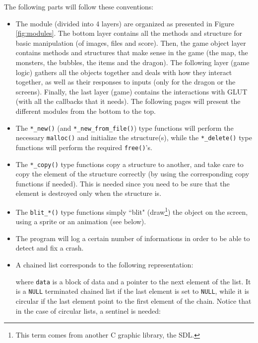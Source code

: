 \documentclass[12pt,a4paper]{article}
\newcommand{\cc}[1]{\texttt{#1}}
\begin{document}
The following parts will follow these conventions:

\begin{itemize}
\item The module (divided into 4 layers) are organized as presented in Figure \ref{fig:modules}. The bottom layer contains all the methods and structure for basic manipulation (of images, files and score). Then, the game object layer contains methods and structures that make sense in the game (the map, the monsters, the bubbles, the items and the dragon). The following layer (game logic) gathers all the objects together and deals with how they interact together, as well as their responses to inputs (only for the dragon or the screens). Finally, the last layer (game) contains the interactions with GLUT (with all the callbacks that it needs). The following pages will present the different modules from the bottom to the top.
\item The \cc{*_new()}  (and \cc{*_new_from_file()}) type functions will perform the necessary \cc{malloc()} and initialize the structure(s), while the \cc{*_delete()} type functions will perform the required \cc{free()}'s. 
\item The \cc{*_copy()} type functions copy a structure to another, and take care to copy the element of the structure correctly (by using the corresponding copy functions if needed). This is needed since you need to be sure that the element is destroyed only when the structure is.
\item  The \cc{blit_*()} type functions simply ``blit" (draw\footnote{This term comes from another C graphic library, the SDL.}) the object on the screen, using a sprite or an animation (see below). 
\item The program will log a certain number of informations in order to be able to detect and fix a crash.
\item A chained list corresponds to the following representation:\begin{center}
\end{center}
where \cc{data} is a block of data and  a pointer to the next element of the list. It is a \cc{NULL} terminated chained list if the last element is set to \cc{NULL}, while it is circular if the last element point to the first element of the chain. Notice that in the case of circular lists, a sentinel is needed: \begin{center}
\end{center}
\end{itemize}
\end{document}
